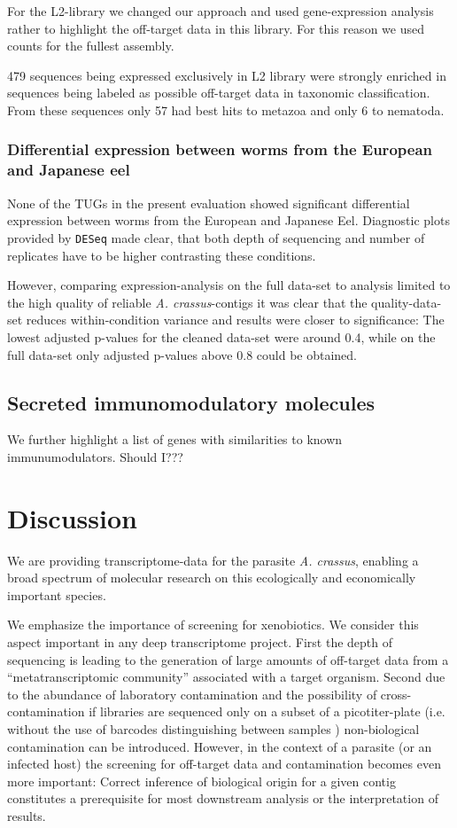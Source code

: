 \documentclass[10pt]{bmc_article}
\newenvironment{bmcformat}{\begin{raggedright}\baselineskip20pt\sloppy\setboolean{publ}{false}}{\end{raggedright}\baselineskip20pt\sloppy}
\begin{document}
\begin{bmcformat}
For the L2-library we changed our approach and used gene-expression
analysis rather to highlight the off-target data in this library. For
this reason we used counts for the fullest assembly.

479 sequences being expressed exclusively
in L2 library were strongly enriched in sequences being labeled as
possible off-target data in taxonomic classification. From these
sequences only 57 had best hits to metazoa and only
6 to nematoda.

\subsubsection*{Differential expression between worms from the European
  and Japanese eel}

None of the TUGs in the present evaluation showed significant
differential expression between worms from the European and Japanese
Eel. Diagnostic plots provided by \texttt{DESeq} made clear, that both
depth of sequencing and number of replicates have to be higher
contrasting these conditions.

However, comparing expression-analysis on the full data-set to analysis
limited to the high quality of reliable \textit{A. crassus}-contigs it
was clear that the quality-data-set reduces within-condition variance
and results were closer to significance: The lowest adjusted p-values
for the cleaned data-set were around 0.4, while on the full data-set
only adjusted p-values above 0.8 could be obtained.

\subsection*{Secreted immunomodulatory molecules}

We further highlight a list of genes with similarities to known
immunumodulators. Should I???


\section*{Discussion}

We are providing transcriptome-data for the parasite
\textit{A. crassus}, enabling a broad spectrum of molecular research on
this ecologically and economically important species.

We emphasize the importance of screening for xenobiotics. We consider
this aspect important in any deep transcriptome project. First the
depth of sequencing is leading to the generation of large amounts of
off-target data from a ``metatranscriptomic community'' associated with a
target organism. Second due to the abundance of laboratory
contamination and the possibility of cross-contamination if libraries
are sequenced only on a subset of a picotiter-plate (i.e. without the
use of barcodes distinguishing between samples \cite{pmid20137071})
non-biological contamination can be introduced. 
However, in the context of a parasite (or an infected host) the
screening for off-target data and contamination becomes even more
important: Correct inference of biological origin for a given contig
constitutes a prerequisite for most downstream analysis or the
interpretation of results.


\end{bmcformat}
\end{document}
